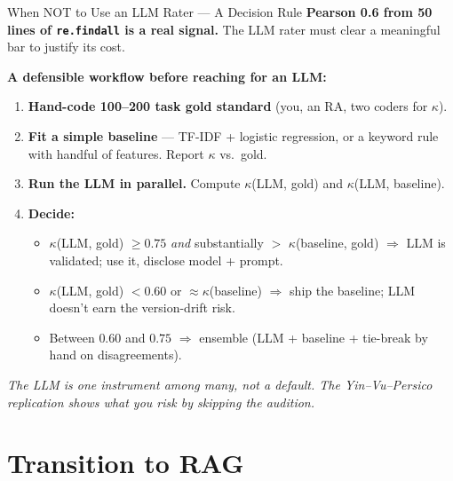 \begin{frame}{When NOT to Use an LLM Rater --- A Decision Rule}
\textbf{Pearson 0.6 from 50 lines of \texttt{re.findall} is a real signal.} The LLM rater must clear a meaningful bar to justify its cost.

\medskip
\small
\textbf{A defensible workflow before reaching for an LLM:}
\begin{enumerate}\itemsep1pt
  \item \textbf{Hand-code 100--200 task gold standard} (you, an RA, two coders for $\kappa$).
  \item \textbf{Fit a simple baseline} --- TF-IDF + logistic regression, or a keyword rule with handful of features. Report $\kappa$ vs.\ gold.
  \item \textbf{Run the LLM in parallel.} Compute $\kappa$(LLM, gold) and $\kappa$(LLM, baseline).
  \item \textbf{Decide:}
  \begin{itemize}\itemsep0pt
    \item $\kappa$(LLM, gold) $\ge 0.75$ \emph{and} substantially $>$ $\kappa$(baseline, gold) $\Rightarrow$ LLM is validated; use it, disclose model + prompt.
    \item $\kappa$(LLM, gold) $< 0.60$ or $\approx \kappa$(baseline) $\Rightarrow$ ship the baseline; LLM doesn't earn the version-drift risk.
    \item Between $0.60$ and $0.75$ $\Rightarrow$ ensemble (LLM + baseline + tie-break by hand on disagreements).
  \end{itemize}
\end{enumerate}

\medskip
\textit{The LLM is one instrument among many, not a default. The Yin--Vu--Persico replication shows what you risk by skipping the audition.}
\end{frame}

\section{Transition to RAG}

